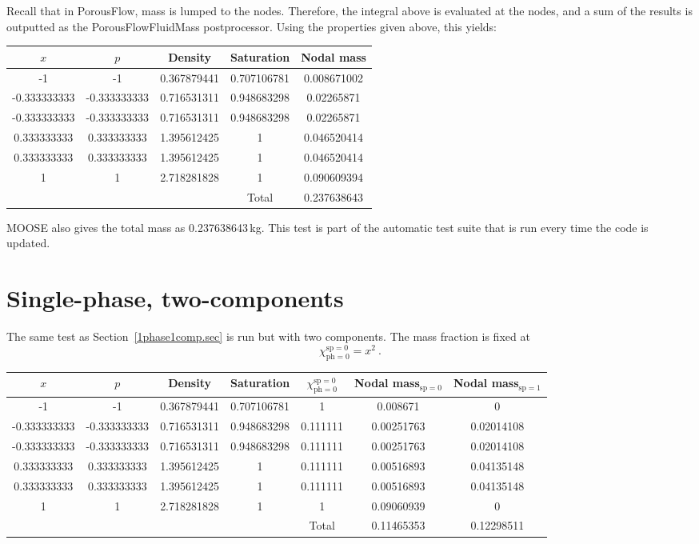 \documentclass[]{scrreprt}
\def\species{\mathrm{sp}}
\def\phase{\mathrm{ph}}
\def\massfrac{\chi}
\begin{document}
Recall that in PorousFlow, mass is lumped to the nodes.  Therefore,
the integral above is evaluated at the nodes, and a sum of the results
is outputted as the PorousFlowFluidMass postprocessor.
Using the properties given above, this yields:
\begin{center}
\begin{tabular}{|ccccc|}
\hline
$x$ & $p$ & Density & Saturation & Nodal mass \\
\hline
-1 & -1 & 0.367879441 & 0.707106781 & 0.008671002 \\
-0.333333333 & -0.333333333 & 0.716531311 & 0.948683298 & 0.02265871 \\
-0.333333333 & -0.333333333 & 0.716531311 & 0.948683298 & 0.02265871 \\
0.333333333 & 0.333333333 & 1.395612425 & 1 & 0.046520414 \\
0.333333333 & 0.333333333 & 1.395612425 & 1 & 0.046520414 \\
1& 1 & 2.718281828 & 1 & 0.090609394 \\
\hline
 & & & Total & 0.237638643 \\
\hline
\end{tabular}
\end{center}
MOOSE also gives the total mass as 0.237638643\,kg.  This test is part of
the automatic test suite that is run every time the code is updated.

\newpage

\section{Single-phase, two-components}

The same test as Section~\ref{1phase1comp.sec} is run but with two
components.  The mass fraction is fixed at
\begin{equation}
\massfrac_{\phase=0}^{\species=0} = x^{2} \ .
\end{equation}

\begin{center}
\begin{tabular}{|ccccccc|}
\hline
$x$ & $p$ & Density & Saturation & $\massfrac_{\phase=0}^{\species=0}$
& Nodal mass$_{\species=0}$ & Nodal mass$_{\species=1}$ \\
\hline
-1 & -1 & 0.367879441 & 0.707106781 & 1 & 0.008671 & 0 \\
-0.333333333 & -0.333333333 & 0.716531311 & 0.948683298 & 0.111111 &
0.00251763 & 0.02014108 \\
-0.333333333 & -0.333333333 & 0.716531311 & 0.948683298 & 0.111111 &
0.00251763 & 0.02014108 \\
0.333333333 & 0.333333333 & 1.395612425 & 1 & 0.111111 & 0.00516893 &
0.04135148 \\
0.333333333 & 0.333333333 & 1.395612425 & 1 & 0.111111 & 0.00516893 &
0.04135148 \\
1& 1 & 2.718281828 & 1 & 1 & 0.09060939 & 0 \\
\hline
 & & & & Total & 0.11465353 & 0.12298511 \\
\hline
\end{tabular}
\end{center}
\end{document}
